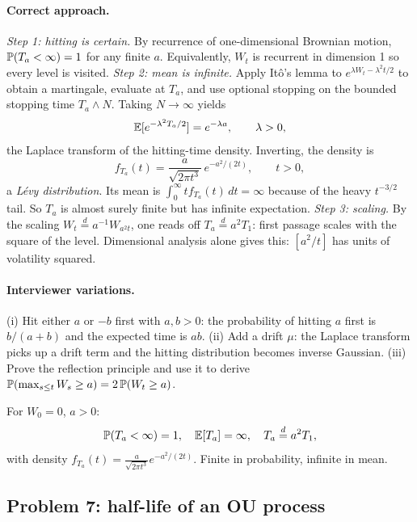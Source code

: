 \paragraph{Correct approach.}
\emph{Step 1: hitting is certain.}  By recurrence of
one-dimensional Brownian motion, $\mathbb{P}(T_a < \infty) = 1$ for
any finite $a$.  Equivalently, $W_t$ is recurrent in dimension 1
so every level is visited.  \emph{Step 2: mean is infinite.}
Apply It\^o's lemma to $e^{\lambda W_t - \lambda^2 t/2}$ to obtain
a martingale, evaluate at $T_a$, and use optional stopping on the
bounded stopping time $T_a \wedge N$.  Taking $N \to \infty$
yields
\[
\mathbb{E}[e^{-\lambda^2 T_a/2}] = e^{-\lambda a}, \qquad \lambda > 0,
\]
the Laplace transform of the hitting-time density.  Inverting,
the density is
\[
f_{T_a}(t) = \frac{a}{\sqrt{2\pi t^3}}\, e^{-a^2/(2t)},
\qquad t > 0,
\]
a \emph{L\'evy distribution}.  Its mean is
$\int_0^\infty t f_{T_a}(t)\,dt = \infty$ because of the heavy
$t^{-3/2}$ tail.  So $T_a$ is almost surely finite but has
infinite expectation.  \emph{Step 3: scaling.}  By the scaling
$W_t \stackrel{d}{=} a^{-1} W_{a^2 t}$, one reads off
$T_a \stackrel{d}{=} a^2 T_1$: first passage scales with the
square of the level.  Dimensional analysis alone gives this:
$[a^2/t]$ has units of volatility squared.

\paragraph{Interviewer variations.}
(i) Hit either $a$ or $-b$ first with $a, b > 0$: the probability
of hitting $a$ first is $b/(a+b)$ and the expected time is $ab$.
(ii) Add a drift $\mu$: the Laplace transform picks up a drift
term and the hitting distribution becomes inverse Gaussian.
(iii) Prove the reflection principle and use it to derive
$\mathbb{P}(\max_{s \le t} W_s \ge a) = 2\,\mathbb{P}(W_t \ge a)$.

\begin{keyfactbox}
For $W_0 = 0$, $a > 0$:
\[
\mathbb{P}(T_a < \infty) = 1, \quad
\mathbb{E}[T_a] = \infty, \quad
T_a \stackrel{d}{=} a^2 T_1,
\]
with density $f_{T_a}(t) = \frac{a}{\sqrt{2\pi t^3}} e^{-a^2/(2t)}$.
Finite in probability, infinite in mean.
\end{keyfactbox}

\subsection{Problem 7: half-life of an OU process}
\label{sec:ou-half}

